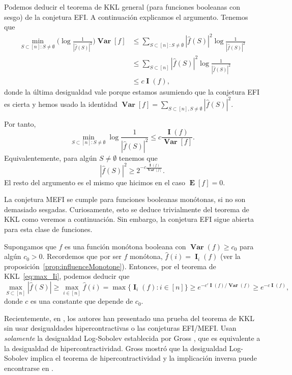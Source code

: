 \documentclass[autocontact]{gaceta}
\DeclareMathOperator{\Var}{\mathbf{Var}}
\DeclareMathOperator{\II}{\mathbf{I}}
\DeclareMathOperator{\EE}{\mathbf{E}}
\begin{document}
Podemos deducir el teorema de KKL general (para funciones booleanas con sesgo) de la conjetura EFI. A continuación explicamos el argumento.
Tenemos que
\begin{align*}
   \min_{S\subset [n] \colon S\neq \emptyset}
   \Big(\log\frac{1}{|\widehat{f}(S)|^2}\Big) \Var[f]
   &\leq \sum_{S\subset [n] \colon S\neq \emptyset} |\widehat{f}(S)|^2
   \log\frac{1}{|\widehat{f}(S)|^2}
   \\
   &\leq \sum_{S\subset [n]} |\widehat{f}(S)|^2 \log\frac{1}{|\widehat{f}(S)|^2}
   \\
   &\leq c \II(f),
\end{align*}
donde la última desigualdad vale porque estamos asumiendo que la conjetura EFI es cierta y hemos usado la identidad $\Var[f]=\sum_{S\subset [n], S\neq\emptyset} |\widehat{f}(S)|^2$.

Por tanto,
\[
   \min_{S\subset [n] \colon S\neq \emptyset}
   \log\frac{1}{|\widehat{f}(S)|^2}
   \leq c \frac{\II(f)}{\Var[f]}.
\]
Equivalentemente, para algún $S\neq \emptyset$ tenemos que
\[
|\widehat{f}(S)|^2 \geq 2^{-c\frac{\II(f)}{\Var[f]}}.
\]
El resto del argumento es el mismo que hicimos en el caso $\EE[f]=0$.

La conjetura MEFI se cumple para funciones booleanas monótonas, si no son demasiado sesgadas. Curiosamente, esto se deduce trivialmente del teorema de KKL \cite{OWZ11} como veremos a continuación. Sin embargo, la conjetura EFI sigue abierta para esta clase de funciones.

Supongamos que $f$ es una función monótona booleana con $\Var (f)\geq c_0$ para algún $c_0>0$. Recordemos que por ser $f$ monótona, $\widehat{f}(i)=\II_i(f)$ (ver la proposición~\ref{prop:influenceMonotone}). Entonces, por el teorema de KKL~\eqref{eq:max_Ii}, podemos deducir que
\[
   \max_{S\subset [n]} |\widehat{f}(S)|
   \geq \max_{i\in [n]} \widehat{f}(i)
   = \max \{ \II_i (f): i\in [n]\}
   \geq e^{-c'\II(f)/\Var(f)} \geq e^{-c \II(f)},
\]
donde $c$ es una constante que depende de $c_0$.

Recientemente, en \cite{KKK+20}, los autores han presentado una prueba del teorema de KKL sin usar desigualdades hipercontractivas o las conjeturas EFI/MEFI. Usan \emph{solamente} la desigualdad Log-Sobolev establecida por
Gross \cite{Gro75}, que es equivalente a la desigualdad de hipercontractividad. Gross \cite{Gro75} mostró que la desigualdad Log-Sobolev implica el teorema de hipercontractividad y la implicación inversa puede encontrarse en \cite[ejercicio 10.23]{O'Do21}.
\end{document}
